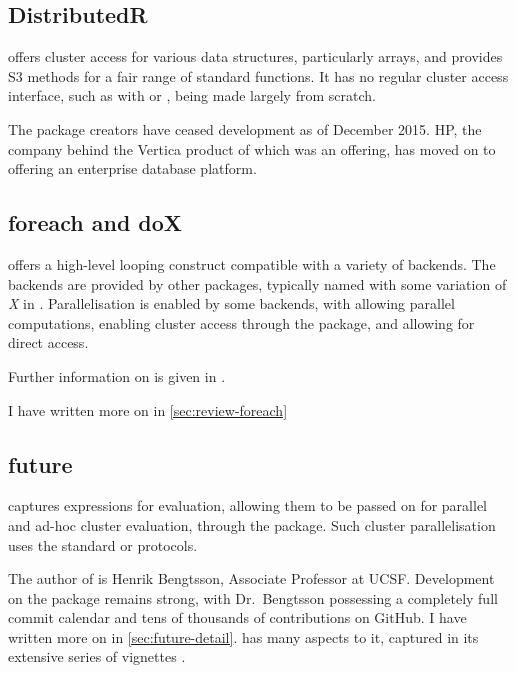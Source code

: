 \subsection{DistributedR}\label{subsec:distributedr}

 offers cluster access for various \R{} data structures,
particularly arrays, and provides S3 methods for a fair range of
standard functions.
It has no regular cluster access interface, such as with  or , being made largely from scratch.

The package creators have ceased development as of December 2015.
HP, the company behind the Vertica product of which  was an offering, has moved on to offering an enterprise database platform\cite{vertica:_distr}.

\subsection{foreach and doX}\label{subsec:foreach-doc}

 offers a high-level looping construct compatible with a variety
of backends\cite{microsoft20}.
The backends are provided by other packages, typically named with some variation of \emph{X} in .
Parallelisation is enabled by some backends, with  allowing parallel computations\cite{corporation19},  enabling cluster access through the  package\cite{dosnow19}, and  allowing for direct  access\cite{weston17}.

Further information on  is given in \cite{weston19:_using}.

I have written more on  in \cref{sec:review-foreach}

\subsection{future}\label{subsec:future-furrr}

 captures \R{} expressions for evaluation, allowing them to be passed on for parallel and ad-hoc cluster evaluation, through the  package\cite{bengtsson20}.
Such cluster parallelisation uses the standard  or  protocols.

The author of  is Henrik Bengtsson, Associate Professor at UCSF.
Development on the package remains strong, with Dr.~Bengtsson possessing a completely full commit calendar and tens of thousands of contributions on GitHub.
I have written more on  in \cref{sec:future-detail}.
 has many aspects to it, captured in its
extensive series of vignettes\cites{bengtsson20:future-r,bengtsson20:future-r2}
\cites{bengtsson20:future-r3,bengtsson20:future-r4,bengtsson20:future-r5,bengtsson20:future-r6}.

